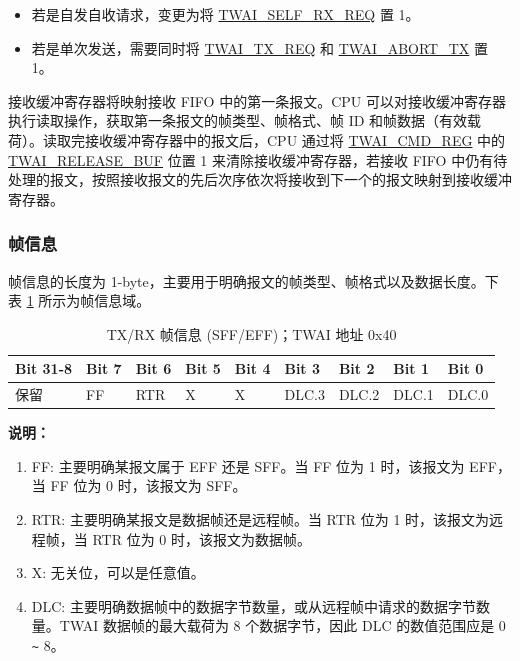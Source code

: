 \documentclass[main\_\_CN.tex]{subfiles}
\begin{document}
\begin{itemize}
    \item 若是自发自收请求，变更为将 \hyperref[fielddesc:TWAISELFRXREQ]{TWAI\_SELF\_RX\_REQ} 置 1。
    \item 若是单次发送，需要同时将 \hyperref[fielddesc:TWAITXREQ]{TWAI\_TX\_REQ} 和 \hyperref[fielddesc:TWAIABORTTX]{TWAI\_ABORT\_TX} 置 1。
\end{itemize}

接收缓冲寄存器将映射接收 FIFO 中的第一条报文。CPU 可以对接收缓冲寄存器执行读取操作，获取第一条报文的帧类型、帧格式、帧 ID 和帧数据（有效载荷）。读取完接收缓冲寄存器中的报文后，CPU 通过将 \hyperref[regdesc:TWAICMDREG]{TWAI\_CMD\_REG} 中的 \hyperref[fielddesc:TWAIRELEASEBUF]{TWAI\_RELEASE\_BUF} 位置 1 来清除接收缓冲寄存器，若接收 FIFO 中仍有待处理的报文，按照接收报文的先后次序依次将接收到下一个的报文映射到接收缓冲寄存器。

\subsubsection{帧信息}
帧信息的长度为 1-byte，主要用于明确报文的帧类型、帧格式以及数据长度。下表 \ref{tab:twai-tx-rx-frame-info-sff-eff} 所示为帧信息域。

\begin{longtable}[c]{|p{1.4cm}|p{1.4cm}|p{1.4cm}|p{1.4cm}|p{1.4cm}|p{1.4cm}|p{1.4cm}|p{1.4cm}|p{1.4cm}|}
    \caption{TX/RX 帧信息 (SFF/EFF)；TWAI 地址 0x40}
    \label{tab:twai-tx-rx-frame-info-sff-eff}\\
    \hline
       \rowcolor{lightgray}
    \textbf{Bit 31-8} & \textbf{Bit 7} & \textbf{Bit 6} & \textbf{Bit 5} & \textbf{Bit 4} & \textbf{Bit 3} & \textbf{Bit 2} & \textbf{Bit 1} & \textbf{Bit 0}\\\hline
    保留 & FF & RTR  & X  & X  & DLC.3 & DLC.2 & DLC.1 & DLC.0\\
    \hline
\end{longtable}
\vspace{-1.5em}
{\bfseries 说明：}\\
\begin{enumerate}
    \item FF: 主要明确某报文属于 EFF 还是 SFF。当 FF 位为 1 时，该报文为 EFF，当 FF 位为 0 时，该报文为 SFF。
    \item RTR: 主要明确某报文是数据帧还是远程帧。当 RTR 位为 1 时，该报文为远程帧，当 RTR 位为 0 时，该报文为数据帧。
    \item X: 无关位，可以是任意值。
    \item DLC: 主要明确数据帧中的数据字节数量，或从远程帧中请求的数据字节数量。TWAI 数据帧的最大载荷为 8 个数据字节，因此 DLC 的数值范围应是 0 \verb+~+ 8。
\end{enumerate}
\end{document}
